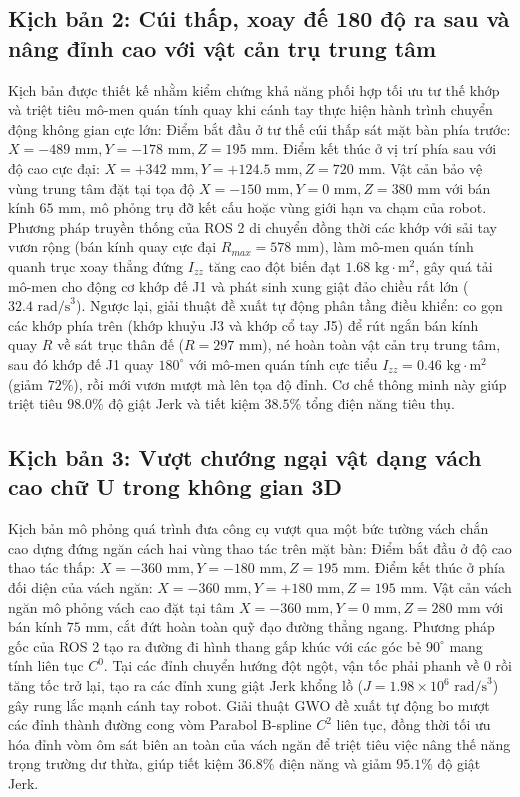 \subsection{Kịch bản 2: Cúi thấp, xoay đế 180 độ ra sau và nâng đỉnh cao với vật cản trụ trung tâm}

Kịch bản được thiết kế nhằm kiểm chứng khả năng phối hợp tối ưu tư thế khớp và triệt tiêu mô-men quán tính quay khi cánh tay thực hiện hành trình chuyển động không gian cực lớn:
Điểm bắt đầu ở tư thế cúi thấp sát mặt bàn phía trước: $X = -489\text{ mm}, Y = -178\text{ mm}, Z = 195\text{ mm}$.
Điểm kết thúc ở vị trí phía sau với độ cao cực đại: $X = +342\text{ mm}, Y = +124.5\text{ mm}, Z = 720\text{ mm}$.
Vật cản bảo vệ vùng trung tâm đặt tại tọa độ $X = -150\text{ mm}, Y = 0\text{ mm}, Z = 380\text{ mm}$ với bán kính $65\text{ mm}$, mô phỏng trụ đỡ kết cấu hoặc vùng giới hạn va chạm của robot.
Phương pháp truyền thống của ROS 2 di chuyển đồng thời các khớp với sải tay vươn rộng (bán kính quay cực đại $R_{max} = 578\text{ mm}$), làm mô-men quán tính quanh trục xoay thẳng đứng $I_{zz}$ tăng cao đột biến đạt $1.68\text{ kg}\cdot\text{m}^2$, gây quá tải mô-men cho động cơ khớp đế J1 và phát sinh xung giật đảo chiều rất lớn ($32.4\text{ rad/s}^3$). Ngược lại, giải thuật đề xuất tự động phân tầng điều khiển: co gọn các khớp phía trên (khớp khuỷu J3 và khớp cổ tay J5) để rút ngắn bán kính quay $R$ về sát trục thân đế ($R = 297\text{ mm}$), né hoàn toàn vật cản trụ trung tâm, sau đó khớp đế J1 quay $180^\circ$ với mô-men quán tính cực tiểu $I_{zz} = 0.46\text{ kg}\cdot\text{m}^2$ (giảm $72\%$), rồi mới vươn mượt mà lên tọa độ đỉnh. Cơ chế thông minh này giúp triệt tiêu $98.0\%$ độ giật Jerk và tiết kiệm $38.5\%$ tổng điện năng tiêu thụ.

\subsection{Kịch bản 3: Vượt chướng ngại vật dạng vách cao chữ U trong không gian 3D}

Kịch bản mô phỏng quá trình đưa công cụ vượt qua một bức tường vách chắn cao dựng đứng ngăn cách hai vùng thao tác trên mặt bàn:
Điểm bắt đầu ở độ cao thao tác thấp: $X = -360\text{ mm}, Y = -180\text{ mm}, Z = 195\text{ mm}$.
Điểm kết thúc ở phía đối diện của vách ngăn: $X = -360\text{ mm}, Y = +180\text{ mm}, Z = 195\text{ mm}$.
Vật cản vách ngăn mô phỏng vách cao đặt tại tâm $X = -360\text{ mm}, Y = 0\text{ mm}, Z = 280\text{ mm}$ với bán kính $75\text{ mm}$, cắt đứt hoàn toàn quỹ đạo đường thẳng ngang.
Phương pháp gốc của ROS 2 tạo ra đường đi hình thang gấp khúc với các góc bẻ $90^\circ$ mang tính liên tục $C^0$. Tại các đỉnh chuyển hướng đột ngột, vận tốc phải phanh về 0 rồi tăng tốc trở lại, tạo ra các đỉnh xung giật Jerk khổng lồ ($J = 1.98 \times 10^6\text{ rad/s}^3$) gây rung lắc mạnh cánh tay robot. Giải thuật GWO đề xuất tự động bo mượt các đỉnh thành đường cong vòm Parabol B-spline $C^2$ liên tục, đồng thời tối ưu hóa đỉnh vòm ôm sát biên an toàn của vách ngăn để triệt tiêu việc nâng thế năng trọng trường dư thừa, giúp tiết kiệm $36.8\%$ điện năng và giảm $95.1\%$ độ giật Jerk.

